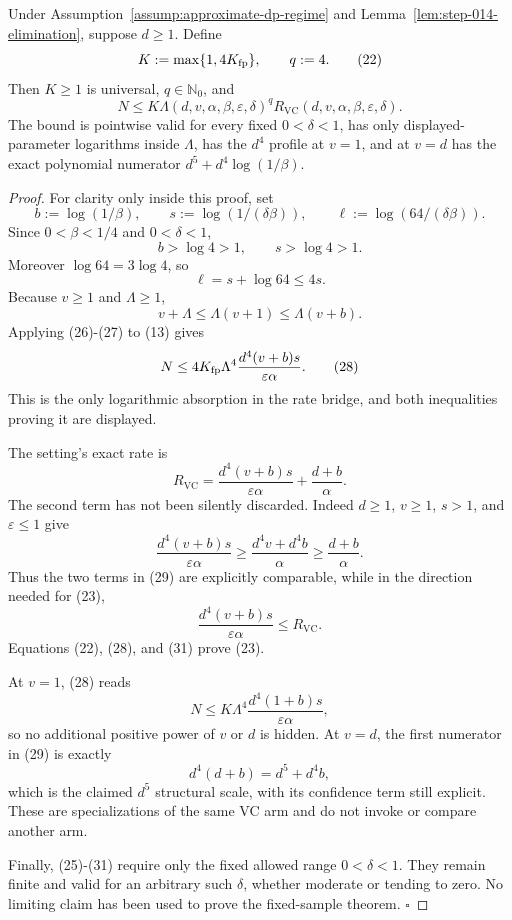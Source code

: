 \begin{proposition}\label{prop:step-014-rate}
Under Assumption~\ref{assump:approximate-dp-regime} and
Lemma~\ref{lem:step-014-elimination}, suppose \(d\geq1\). Define
\[
 K:=\max\{1,4K_{\rm fp}\},
 \qquad q:=4.
\tag{22}
\]
Then \(K\geq1\) is universal, \(q\in\mathbb N_0\), and
\[
 N\leq
 K\Lambda(d,v,\alpha,\beta,\varepsilon,\delta)^q
 R_{\mathrm{VC}}(d,v,\alpha,\beta,\varepsilon,\delta).
\tag{23}
\]
The bound is pointwise valid for every fixed \(0<\delta<1\), has only
displayed-parameter logarithms inside \(\Lambda\), has the \(d^4\) profile
at \(v=1\), and at \(v=d\) has the exact polynomial numerator
\(d^5+d^4\log(1/\beta)\).


\end{proposition}

\begin{proof}
For clarity only inside this proof, set
\[
 b:=\log(1/\beta),\qquad
 s:=\log(1/(\delta\beta)),\qquad
 \ell:=\log(64/(\delta\beta)).
\tag{24}
\]
Since \(0<\beta<1/4\) and \(0<\delta<1\),
\[
 b>\log4>1,\qquad s>\log4>1.
\tag{25}
\]
Moreover \(\log64=3\log4\), so
\[
 \ell=s+\log64\leq4s.
\tag{26}
\]
Because \(v\geq1\) and \(\Lambda\geq1\),
\[
 v+\Lambda\leq\Lambda(v+1)\leq\Lambda(v+b).
\tag{27}
\]
Applying (26)-(27) to (13) gives
\[
 N
 \leq
 4K_{\rm fp}\Lambda^4
 \frac{d^4(v+b)s}{\varepsilon\alpha}.
\tag{28}
\]
This is the only logarithmic absorption in the rate bridge, and both
inequalities proving it are displayed.

The setting's exact rate is
\[
 R_{\mathrm{VC}}
 =
 \frac{d^4(v+b)s}{\varepsilon\alpha}
 +\frac{d+b}{\alpha}.
\tag{29}
\]
The second term has not been silently discarded. Indeed
\(d\geq1\), \(v\geq1\), \(s>1\), and \(\varepsilon\leq1\) give
\[
 \frac{d^4(v+b)s}{\varepsilon\alpha}
 \geq
 \frac{d^4v+d^4b}{\alpha}
 \geq
 \frac{d+b}{\alpha}.
\tag{30}
\]
Thus the two terms in (29) are explicitly comparable, while in the
direction needed for (23),
\[
 \frac{d^4(v+b)s}{\varepsilon\alpha}
 \leq R_{\mathrm{VC}}.
\tag{31}
\]
Equations (22), (28), and (31) prove (23).

At \(v=1\), (28) reads
\[
 N\leq
 K\Lambda^4
 \frac{d^4(1+b)s}{\varepsilon\alpha},
\tag{32}
\]
so no additional positive power of \(v\) or \(d\) is hidden. At \(v=d\),
the first numerator in (29) is exactly
\[
 d^4(d+b)=d^5+d^4b,
\tag{33}
\]
which is the claimed \(d^5\) structural scale, with its confidence term
still explicit. These are specializations of the same VC arm and do not
invoke or compare another arm.

Finally, (25)-(31) require only the fixed allowed range \(0<\delta<1\).
They remain finite and valid for an arbitrary such \(\delta\), whether
moderate or tending to zero. No limiting claim has been used to prove the
fixed-sample theorem. \(\square\)


\end{proof}

